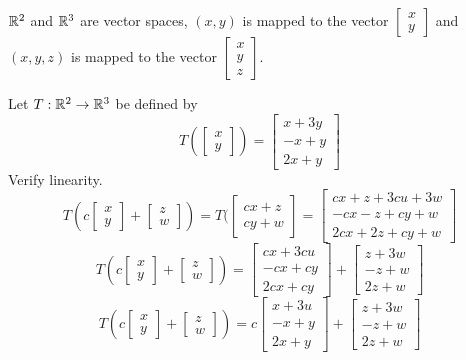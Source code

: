 $\mathbb{R}^2$ and $\mathbb{R}^3$ are vector spaces, $(x,y)$ is mapped to the vector $\begin{bmatrix}x\\y
\end{bmatrix}$ and $(x,y,z)$ is mapped to the vector $\begin{bmatrix}x\\y\\z
\end{bmatrix}$.
\begin{ex}
Let $T:\mathbb{R}^2\to\mathbb{R}^3$ be defined by \[T(\begin{bmatrix}x\\y\end{bmatrix})=\begin{bmatrix}x+3y\\-x+y\\2x+y\end{bmatrix}\]
Verify linearity.
\[T(c\begin{bmatrix}x\\y\end{bmatrix}+\begin{bmatrix}z\\w\end{bmatrix})=T(\begin{bmatrix}cx+z\\cy+w\end{bmatrix}=\begin{bmatrix}cx+z+3cu+3w\\-cx-z+cy+w\\2cx+2z+cy+w\end{bmatrix}\]
\[T(c\begin{bmatrix}x\\y\end{bmatrix}+\begin{bmatrix}z\\w\end{bmatrix})=\begin{bmatrix}cx+3cu\\-cx+cy\\2cx+cy\end{bmatrix}+\begin{bmatrix}z+3w\\-z+w\\2z+w\end{bmatrix}\]
\[T(c\begin{bmatrix}x\\y\end{bmatrix}+\begin{bmatrix}z\\w\end{bmatrix})=c\begin{bmatrix}x+3u\\-x+y\\2x+y\end{bmatrix}+\begin{bmatrix}z+3w\\-z+w\\2z+w\end{bmatrix}\]

\end{ex}

